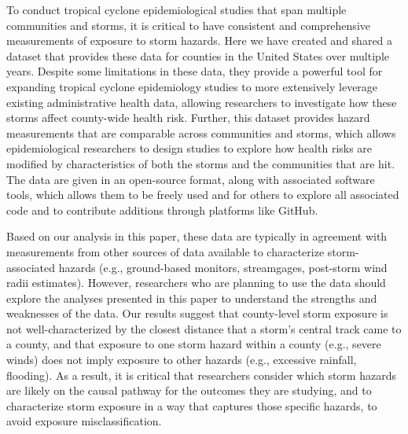 To conduct tropical cyclone epidemiological studies that span multiple
communities and storms, it is critical to have consistent and comprehensive
measurements of exposure to storm hazards. Here we have created and shared a
dataset that provides these data for counties in the United States over
multiple years. Despite some limitations in these data, they provide a powerful
tool for expanding tropical cyclone epidemiology studies to more extensively
leverage existing administrative health data, allowing researchers to
investigate how these storms affect county-wide health risk.  Further, this
dataset provides hazard measurements that are comparable across communities and
storms, which allows epidemiological researchers to design studies to explore
how health risks are modified by characteristics of both the storms and the
communities that are hit. The data are given in an open-source format, along
with associated software tools, which allows them to be freely used and for
others to explore all associated code and to contribute additions through
platforms like GitHub.

Based on our analysis in this paper, these data are typically in agreement with
measurements from other sources of data available to characterize
storm-associated hazards (e.g., ground-based monitors, streamgages, post-storm
wind radii estimates).  However, researchers who are planning to use the data
should explore the analyses presented in this paper to understand the strengths
and weaknesses of the data.  Our results suggest that county-level storm
exposure is not well-characterized by the closest distance that a storm's
central track came to a county, and that exposure to one storm hazard within a
county (e.g., severe winds) does not imply exposure to other hazards (e.g.,
excessive rainfall, flooding). As a result, it is critical that researchers
consider which storm hazards are likely on the causal pathway for the outcomes
they are studying, and to characterize storm exposure in a way that captures
those specific hazards, to avoid exposure misclassification. 
